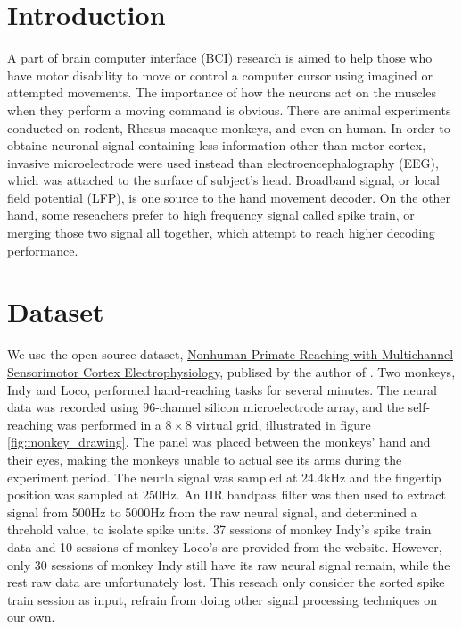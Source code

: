 \documentclass[8pt,a4paper]{article}
\begin{document}
\begin{multicols}{2}

\section*{Introduction}

A part of brain computer interface (BCI) research is aimed to help those who have motor disability to move or control a computer cursor using imagined or attempted movements\cite{hosman2019bci}. 
The importance of how the neurons act on the muscles when they perform a moving command is obvious. There are animal experiments conducted on rodent\cite{tampuu2019efficient}, Rhesus macaque monkeys\cite{makin2018}, and even on human\cite{kumar2018eeg}. 
In order to obtaine neuronal signal containing less information other than motor cortex, invasive microelectrode were used instead than electroencephalography (EEG), which was attached to the surface of subject's head. 
Broadband signal, or local field potential (LFP), is one source to the hand movement decoder\cite{ahmadi2019decoding}\cite{ahmadi2019end}. 
On the other hand, some reseachers prefer to high frequency signal called spike train\cite{makin2018}, or merging those two signal all together\cite{stavisky2015high}, which attempt to reach higher decoding performance.
 

\section*{Dataset}

We use the open source dataset, \href{https://zenodo.org/record/583331#.XWirEigzZPb}{Nonhuman Primate Reaching with Multichannel Sensorimotor Cortex Electrophysiology}, 
publised by the author of \cite{makin2018}. Two monkeys, Indy and Loco, performed hand-reaching tasks for several minutes. 
The neural data was recorded using 96-channel silicon microelectrode array, and the self-reaching was performed in a  $8 \times 8$ virtual grid, illustrated in figure \ref{fig:monkey_drawing}.
The panel was placed between the monkeys' hand and their eyes, making the monkeys unable to actual see its arms during the experiment period. 
The neurla signal was sampled at 24.4kHz and the fingertip position was sampled at 250Hz. 
An IIR bandpass filter was then used to extract signal from 500Hz to 5000Hz from the raw neural signal, and determined a threhold value, to isolate spike units. 
37 sessions of monkey Indy's spike train data and 10 sessions of monkey Loco's are provided from the website.  
However, only 30 sessions of monkey Indy still have its raw neural signal remain, while the rest raw data are unfortunately lost. 
This reseach only consider the sorted spike train session as input, refrain from doing other signal processing techniques on our own.



\end{multicols}
\end{document}
